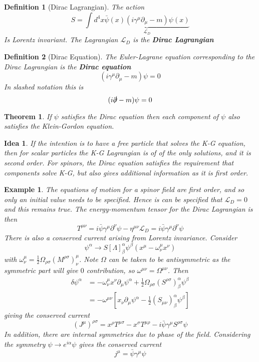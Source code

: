 \documentclass{article}
\newtheorem{theorem}{Theorem}[subsection]
\newtheorem{definition}{Definition}[subsection]
\newtheorem*{idea}{Idea}
\newtheorem{example}{Example}[subsection]
\newcommand{\del}{\partial}
\newcommand{\bam}[1]{\textbf{#1}}
\newcommand{\mc}[1]{\mathcal{#1}}
\begin{document}
\begin{definition}[Dirac Lagrangian]
The action
\[
S=\int d^{4}x \underbrace{\bar{\psi}(x)\left(i\gamma^\mu\del_\mu-m\right)\psi(x)}_{\mc{L}_D}
\]
Is Lorentz invariant. The Lagrangian $\mc{L}_D$ is the \bam{Dirac Lagrangian}
\end{definition}

\begin{definition}[Dirac Equation]
The Euler-Lagrane equation corresponding to the Dirac Lagrangian is the \bam{Dirac equation}
\[
\left(i\gamma^\mu\del_\mu-m\right)\psi=0
\]
In slashed notation this is 
\[
(i \slashed{\del}-m)\psi=0
\]
\end{definition}

\begin{theorem}
If $\psi$ satisfies the Dirac equation then each component of $\psi$ also satisfies the Klein-Gordon equation. 
\end{theorem}

\begin{idea}
If the intention is to have a free particle that solves the K-G equation, then for scalar particles the K-G Lagrangian is of of the only solutions, and it is second order. For spinors, the Dirac equation satisfies the requirement that components solve K-G, but also gives additional information as it is first order. 
\end{idea}

\begin{example}
The equations of motion for a spinor field are first order, and so only an initial value needs to be specified. Hence is can be specified that $\mc{L}_D=0$ and this remains true. 
The energy-momentum tensor for the Dirac Lagrangian is then  
\[
T^{\mu\nu} = i\bar{\psi}\gamma^\mu\del^\nu\psi-\eta^{\mu\nu}\mc{L}_D = i\bar{\psi}\gamma^\mu\del^\nu\psi
\]
There is also a conserved current arising from Lorentz invariance. Consider 
\[
\psi^\alpha \to S[\Lambda]^\alpha_\beta \psi^\beta (x^\mu-\omega^\mu_\nu x^\nu )
\]
with $\omega^\mu_\nu = \frac{1}{2} \Omega_{\rho\sigma}(M^{\rho\sigma})^\mu_\nu$. Note $\Omega$ can be taken to be antisymmetric as the symmetric part will give $0$ contribution, so $\omega^{\mu\nu}=\Omega^{\mu\nu}$. Then 
\begin{align*}
\delta \psi^\alpha &= -\omega^\mu_\nu x^\nu \del_\mu \psi^\alpha + \frac{1}{2}\Omega_{\rho\sigma}(S^{\rho\sigma})^\alpha_\beta \psi^\beta \\
&= -\omega^{\mu\nu} \left[ x_\nu \del_\mu \psi^\alpha -\frac{1}{2} (S_{\mu\nu})^\alpha_\beta \psi^\beta \right]
\end{align*}
giving the conserved current
\[
(J^\mu)^{\rho\sigma}=x^\rho T^{\mu\sigma}-x^\sigma T^{\mu\rho}-i\bar{\psi} \gamma^\mu S^{\rho\sigma} \psi
\]
In addition, there are internal symmetries due to phase of the field. Considering the symmetry $\psi \to e^{i\alpha} \psi$ gives the conserved current 
\[
j^\mu = \bar{\psi} \gamma^\mu \psi
\]
\end{example}
\end{document}
